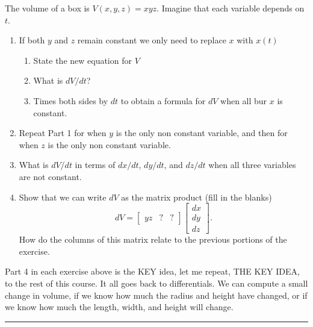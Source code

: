 \begin{problem}\label{prob:volumebox}
 The volume of a box is $V(x,y,z)=xyz$. Imagine that each variable depends on $t$. 
\begin{enumerate}
	\item If both $y$ and $z$ remain constant we only need to replace $x$ with $x(t)$
		\begin{enumerate}
			\item State the new equation for $V$
			\item What is $dV/dt$? 
			\item Times both sides by $dt$ to obtain a formula for $dV$ when all bur $x$ is constant.
		\end{enumerate}
	\item Repeat Part 1 for when $y$ is the only non constant variable, and then for when $z$ is the only non constant variable. 
	\item What is $dV/dt$ in terms of $dx/dt$, $dy/dt$, and $dz/dt$ when all three variables are not constant.
	\item%
% 
Show that we can write $dV$ as the matrix product (fill in the blanks) 
 $$dV = \begin{bmatrix}yz& ?&?\end{bmatrix}\begin{bmatrix}dx\\dy\\dz\end{bmatrix}.$$ 
 How do the columns of this matrix relate to the previous portions of the exercise.
\end{enumerate}

\end{problem}

Part 4 in each exercise above is the KEY idea, let me repeat, THE KEY IDEA, to the rest of this course. It all goes back to differentials. We can compute a small change in volume, if we know how much the radius and height have changed, or if we know how much the length, width, and height will change.  

\vskip0.1in
\hrule

